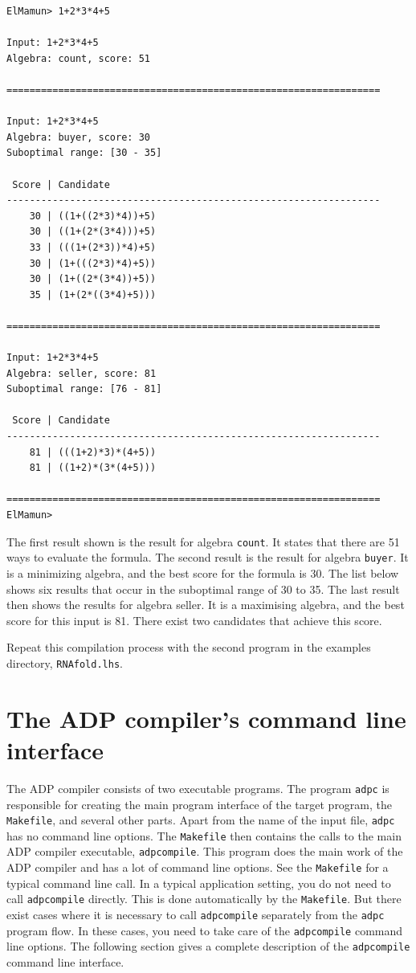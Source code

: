 \documentclass[a4paper]{article}
\begin{document}
\begin{verbatim}
ElMamun> 1+2*3*4+5

Input: 1+2*3*4+5
Algebra: count, score: 51

=================================================================

Input: 1+2*3*4+5
Algebra: buyer, score: 30
Suboptimal range: [30 - 35]

 Score | Candidate
-----------------------------------------------------------------
    30 | ((1+((2*3)*4))+5)
    30 | ((1+(2*(3*4)))+5)
    33 | (((1+(2*3))*4)+5)
    30 | (1+(((2*3)*4)+5))
    30 | (1+((2*(3*4))+5))
    35 | (1+(2*((3*4)+5)))

=================================================================

Input: 1+2*3*4+5
Algebra: seller, score: 81
Suboptimal range: [76 - 81]

 Score | Candidate
-----------------------------------------------------------------
    81 | (((1+2)*3)*(4+5))
    81 | ((1+2)*(3*(4+5)))

=================================================================
ElMamun> 
\end{verbatim}

The first result shown is the result for algebra \texttt{count}. It
states that there are 51 ways to evaluate the formula. The second
result is the result for algebra \texttt{buyer}. It is a minimizing
algebra, and the best score for the formula is 30. The list below
shows six results that occur in the suboptimal range of 30 to 35. The
last result then shows the results for algebra seller. It is a
maximising algebra, and the best score for this input is 81. There
exist two candidates that achieve this score.

Repeat this compilation process with the second program in the
examples directory, \texttt{RNAfold.lhs}.

\section{The ADP compiler's command line interface}
\label{sec:options}

The ADP compiler consists of two executable programs. The program
\texttt{adpc} is responsible for creating the main program interface
of the target program, the \texttt{Makefile}, and several other parts.
Apart from the name of the input file, \texttt{adpc} has no command
line options.  The \texttt{Makefile} then contains the calls to the
main ADP compiler executable, \texttt{adpcompile}. This program does
the main work of the ADP compiler and has a lot of command line
options. See the \texttt{Makefile} for a typical command line call.
In a typical application setting, you do not need to call
\texttt{adpcompile} directly. This is done automatically by the
\texttt{Makefile}. But there exist cases where it is necessary to call
\texttt{adpcompile} separately from the \texttt{adpc} program flow. In
these cases, you need to take care of the \texttt{adpcompile} command
line options.  The following section gives a complete description of
the \texttt{adpcompile} command line interface.


\end{document}
